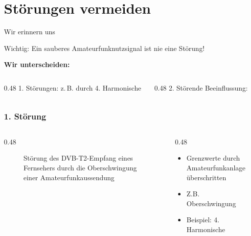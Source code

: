 
\section{Störungen vermeiden}
\label{section:stoerungen_vermeiden}

\begin{frame}{Wir erinnern uns}
    \begin{alertblock}{Wichtig:}
        Ein sauberes Amateurfunknutzsignal ist nie eine Störung!
    \end{alertblock}

    \textbf{Wir unterscheiden:}

    \begin{columns}[T]
        \begin{column}{0.48\linewidth}
                \textcolor{DARCblue}{1.} Störungen:
                \small z.\,B. durch 4. Harmonische
        \end{column}
        \begin{column}{0.48\linewidth}
            \textcolor{DARCblue}{2.} Störende Beeinflussung:
        \end{column}
    \end{columns}
\end{frame}

\begin{frame}
    \frametitle{1. Störung}
    \begin{columns}
        \begin{column}{0.48\textwidth}
            \begin{figure}
                \caption{\scriptsize Störung des DVB-T2-Empfang eines Fernsehers durch die Oberschwingung einer Amateurfunkaussendung}
                \label{stoerungen_vermeiden_oberschwingung}
            \end{figure}
        \end{column}
        \begin{column}{0.48\textwidth}
            \begin{itemize}
                \item Grenzwerte durch Amateurfunkanlage überschritten
                \item Z.B. Oberschwingung
                \item Beispiel: 4. Harmonische
            \end{itemize}

        \end{column}
    \end{columns}

\end{frame}

